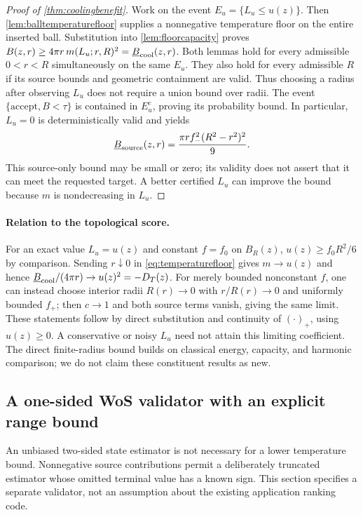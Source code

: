 \begin{proof}[Proof of \cref{thm:coolingbenefit}]
Work on the event $E_u=\{L_u\le u(z)\}$. Then \cref{lem:balltemperaturefloor} supplies a
nonnegative temperature floor on the entire inserted ball. Substitution into
\cref{lem:floorcapacity} proves
$B(z,r)\ge4\pi r\,m(L_u;r,R)^2=\underline B_{\rm cool}(z,r)$.
Both lemmas hold for every admissible $0<r<R$ simultaneously on the same
$E_u$. They also hold for every admissible $R$ if its source bounds and
geometric containment are valid. Thus choosing a radius after observing
$L_u$ does not require a union bound over radii. The event
$\{\text{accept},B<\tau\}$ is contained in $E_u^c$, proving its probability
bound. In particular, $L_u=0$ is deterministically valid and yields
\begin{equation}
 \underline B_{\rm source}(z,r)
 =\frac{\pi r f_-^2(R^2-r^2)^2}{9}.
 \label{eq:sourceonlybenefit}
\end{equation}
This source-only bound may be small or zero; its validity does not assert
that it can meet the requested target. A better certified $L_u$ can improve
the bound because $m$ is nondecreasing in $L_u$.
\end{proof}

\paragraph{Relation to the topological score.}
For an exact value $L_u=u(z)$ and constant $f=f_0$ on $B_R(z)$,
$u(z)\ge f_0R^2/6$ by comparison. Sending $r\downarrow0$ in
\cref{eq:temperaturefloor} gives $m\to u(z)$ and hence
$\underline B_{\rm cool}/(4\pi r)\to u(z)^2=-D_T(z)$.
For merely bounded nonconstant $f$, one can instead choose interior radii
$R(r)\to0$ with $r/R(r)\to0$ and uniformly bounded $f_+$; then $c\to1$
and both source terms vanish, giving the same limit. These statements follow
by direct substitution and continuity of $(\cdot)_+$, using $u(z)\ge0$.
A conservative or noisy $L_u$ need not attain this limiting coefficient.
The direct finite-radius bound builds on classical energy, capacity, and
harmonic comparison; we do not claim these constituent results as new.

\subsection{A one-sided WoS validator with an explicit range bound}

An unbiased two-sided state estimator is not necessary for a lower
temperature bound. Nonnegative source contributions permit a deliberately
truncated estimator whose omitted terminal value has a known sign. This
section specifies a separate validator, not an assumption about the existing
application ranking code.

